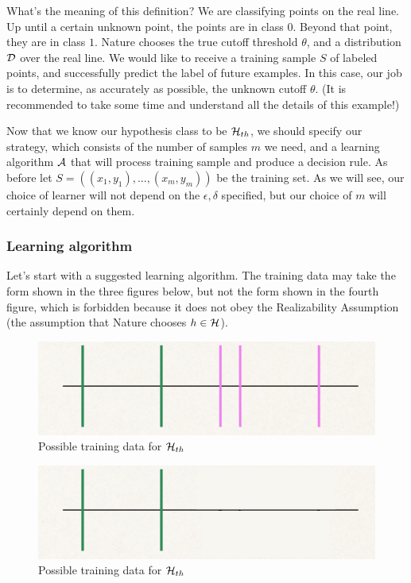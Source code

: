 What's the meaning of this definition? We are classifying points on the real line. Up until a certain unknown point, the points are in class $0$. Beyond that point, they are in class $1$. Nature chooses the true cutoff threshold $\theta$, and a distribution $\mathcal{D}$ over the real line.  We would like to receive a training sample $S$ of labeled points, and successfully predict the label of future examples. In this case, our job is to determine, as accurately as possible, the unknown cutoff $\theta$. (It is recommended to take some time and understand all the details of this example!) 

Now that we know our hypothesis class to be $\mathcal{H}_{th}$, we should specify our strategy, which consists of the number of samples $m$ we need, and a learning algorithm $\mathcal{A}$ that will process training sample and produce a decision rule. As before let $S=((x_1,y_1),...,(x_m,y_m))$ be the training set. As we will see, our choice of learner will not depend on the $\epsilon, \delta$ specified, but our choice of $m$ will certainly depend on them.

\subsubsection*{Learning algorithm}

Let's start with a suggested learning algorithm.
The training data may take the form shown in the three figures below, but not
the form shown in the fourth figure, which is forbidden because it does not obey
the Realizability Assumption (the assumption that Nature chooses $h\in\mathcal{H}$).

\begin{figure}[h!]
\centering
\includegraphics[scale=0.3]{thresholds1.png}
\caption{Possible training data for $\mathcal{H}_{th}$}
\end{figure}

\begin{figure}[h!]
\centering
\includegraphics[scale=0.3]{thresholds1a.png}
\caption{Possible training data for $\mathcal{H}_{th}$}
\end{figure}

